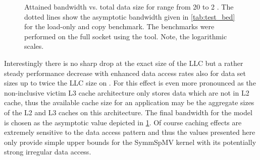 \begin{figure}[tbp]
	\centering
	\caption{Attained bandwidth vs. total data size for range from 20 \MB to 2 \GB. The dotted lines show the asymptotic bandwidth given in \cref{tab:test_bed} for the load-only and copy benchmark. The benchmarks were performed on the full socket using the \likwidBench tool. Note, the logarithmic scales.}
	\label{fig:size_vs_bw}
\end{figure}
Interestingly there is no sharp drop at the exact size of the \acrshort{LLC} but a rather steady performance decrease with enhanced data access rates also for data set sizes up to twice the \acrshort{LLC} size on \IVB. For \SKX this effect is even more pronounced as the non-inclusive victim L3 cache architecture only stores data which are not in L2 cache, thus the available cache size for an application may be the aggregate sizes of the L2 and L3 caches on this architecture. The final bandwidth for the  \roofline model is chosen as the asymptotic value depicted in \cref{fig:size_vs_bw}. Of course caching effects are extremely sensitive to the data access pattern and thus the values presented here only provide simple upper bounds for the \acrshort{SymmSpMV} kernel with its potentially strong irregular data access. 

